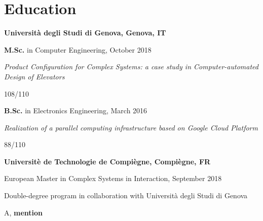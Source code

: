 \section{\sc Education}
{\bf Universit\`a degli Studi di Genova, Genova, IT}
\begin{list1}
\item[] \textbf{M.Sc.} in Computer Engineering, October 2018
\item[] \textit{Product Configuration for Complex Systems: a case study
	in Computer-automated Design of Elevators}
\item[] 108/110
\end{list1}
\begin{list1}
	\item[] \textbf{B.Sc.} in Electronics Engineering, March 2016
	\item[] \textit{Realization of a parallel computing infrastructure 
		based on Google Cloud Platform}
	\item[] 88/110
\end{list1}

{\bf Universit\`e de Technologie de Compi\`egne, Compi\`egne, FR}
\begin{list1}
	\item[] European Master in Complex Systems in Interaction, September 2018
	\item[] Double-degree program in collaboration with Universit\`a 
	degli Studi di Genova
	\item[] A, \textbf{mention}
\end{list1}
%
